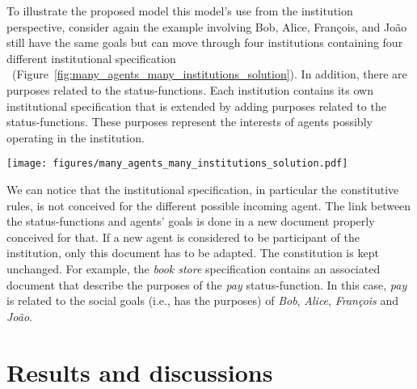 \documentclass[runningheads]{llncs}
\begin{document}
To illustrate the proposed model this model's use from the institution perspective, consider again the example involving Bob, Alice, François, and João still have the same goals but can move through four institutions containing four different institutional specification ~(Figure~\ref{fig:many_agents_many_institutions_solution}). 
In addition, there are purposes related to the status-functions.
Each institution contains its own institutional specification that is extended by adding purposes related to the status-functions. These purposes represent the interests of agents possibly operating in the institution.


\begin{figure*}[!ht]\centering %
	\texttt{[image: figures/many\_agents\_many\_institutions\_solution.pdf]}
	\caption{Use of the proposed model in some institutional specifications.}
	\label{fig:many_agents_many_institutions_solution}
\end{figure*}


We can notice that the institutional specification, in particular the constitutive rules, is not conceived for the different possible incoming agent. The link between the status-functions and agents' goals is done in a new document properly conceived for that. If a new agent is considered to be participant of the institution, only this document has to be adapted. The constitution is kept unchanged.
For example, the \emph{book store} specification contains an associated document that describe the purposes of the \emph{pay} status-function. In this case, \emph{pay} is related to the social goals (i.e., has the purposes) of \emph{Bob}, \emph{Alice}, \emph{François} and \emph{João}. 


\section{Results and discussions}
\label{result_and_discussion}
 
\end{document}
